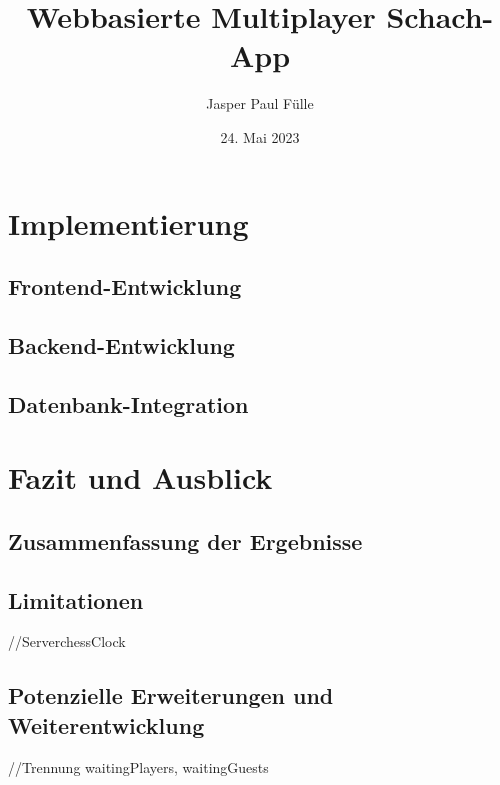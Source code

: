 \documentclass[a4paper, 11pt, bibliography=totoc, abstract=true]{scrreprt}
\title{Webbasierte Multiplayer Schach-App}
\author{Jasper Paul Fülle}
\date{24. Mai 2023}
\begin{document}



\setcounter{page}{1}
\tableofcontents
\newpage
\newpage\thispagestyle{empty}\hspace{1em}\newpage
{}
\setcounter{page}{1}

\newpage
\newpage\thispagestyle{empty}\hspace{1em}\newpage
	
	\newpage
\newpage\thispagestyle{empty}\hspace{1em}\newpage

\newpage
\newpage\thispagestyle{empty}\hspace{1em}\newpage
\chapter{Implementierung}
    \section{Frontend-Entwicklung}
    \section{Backend-Entwicklung}
    \section{Datenbank-Integration}
    \newpage
\newpage\thispagestyle{empty}\hspace{1em}\newpage

\chapter{Fazit und Ausblick}
    \section{Zusammenfassung der Ergebnisse}
    \section{Limitationen}
    //ServerchessClock
    \section{Potenzielle Erweiterungen und Weiterentwicklung}
    //Trennung waitingPlayers, waitingGuests

\appendix

\listoffigures


\end{document}
